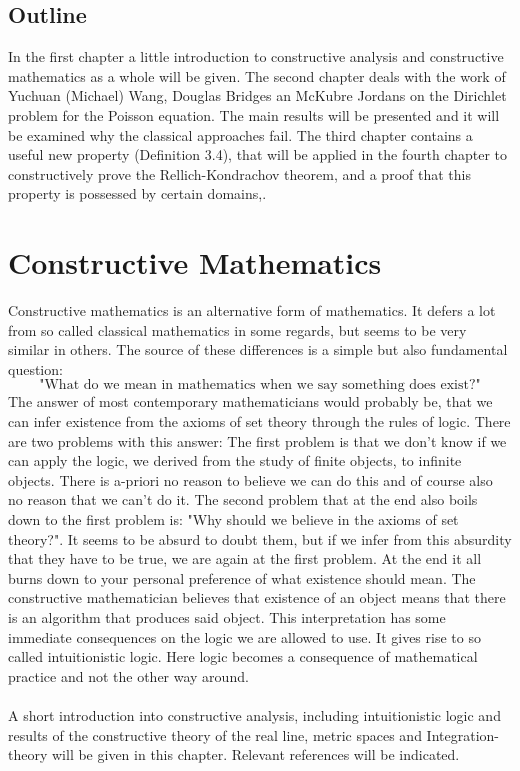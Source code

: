 \documentclass[11pt,a4paper,leqno]{report}
\numberwithin{equation}{chapter}
\begin{document}
\section*{Outline}
In the first chapter a little introduction to constructive analysis and constructive mathematics as a whole will be given. The second chapter deals with the work of Yuchuan (Michael) Wang, Douglas Bridges an McKubre Jordans on the Dirichlet problem for the Poisson equation. The main results will be presented and it will be examined why the classical approaches fail. The third chapter contains a useful new property (Definition 3.4), that will be applied in the fourth chapter to constructively prove the Rellich-Kondrachov theorem, and a proof that this property is possessed by certain domains,.

\chapter{Constructive Mathematics}
\setcounter{page}{1}
Constructive mathematics is an alternative form of mathematics. It defers a lot from so called classical mathematics in some regards, but seems to be very similar in others. The source of these differences is a simple but also fundamental question:
$$\text{"What do we mean in mathematics when we say something  does exist?"}$$ The answer of most contemporary mathematicians would probably be, that we can infer existence from the axioms of set theory through the rules of logic.
There are two problems with this answer: The first problem is that we don't know if we can apply the logic, we derived from the study of finite objects, to infinite objects. There is a-priori no reason to believe we can do this and of course also no reason that we can't do it. The second problem that at the end also boils down to the first problem is: "Why should we believe in the axioms of set theory?". It seems to be absurd to doubt them, but if we infer from this absurdity that they have to be true, we are again at the first problem.
At the end it all burns down to your personal preference of what existence should mean. The constructive mathematician believes that existence of an object means that there is an algorithm that produces said object. This interpretation has some immediate consequences on the logic we are allowed to use. It gives rise to so called intuitionistic logic. Here logic becomes a consequence of mathematical practice and not the other way around.
\\
\\
A short introduction into constructive analysis, including intuitionistic logic and results of the constructive theory of the real line, metric spaces and Integration-theory will be given in this chapter. Relevant references will be indicated.
\end{document}
